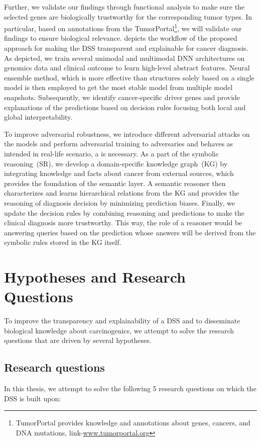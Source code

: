 \hspace*{3.5mm} Further, we validate our findings through functional analysis to make sure the selected genes are biologically trustworthy for the corresponding tumor types. In particular, based on annotations from the TumorPortal\footnote{
TumorPortal provides knowledge and annotations about genes, cancers, and DNA mutations, link-\url{www.tumorportal.org}}, we will validate our findings to ensure biological relevance.  depicts the workflow of the proposed approach for making the DSS transparent and explainable for cancer diagnosis. As depicted, we train several unimodal and multimodal DNN architectures on genomics data and clinical outcome to learn high-level abstract features. Neural ensemble method, which is more effective than structures solely based on a single model is then employed to get the most stable model from multiple model snapshots. Subsequently, we identify cancer-specific driver genes and provide explanations of the predictions based on decision rules focusing both local and global interpretability. 

\hspace*{3.5mm} To improve adversarial robustness, we introduce different adversarial attacks on the models and perform adversarial training to adversaries and behaves as intended in real-life scenario, a is necessary. As a part of the symbolic reasoning~(SR), we develop a domain-specific knowledge graph~(KG) by integrating knowledge and facts about cancer from external sources, which provides the foundation of the semantic layer. A semantic reasoner then characterizes and learns hierarchical relations from the KG and provides the reasoning of diagnosis decision by minimizing prediction biases. 
Finally, we update the decision rules by combining reasoning and predictions to make the clinical diagnosis more trustworthy. This way, the role of a reasoner would be answering queries based on the prediction whose answers will be derived from the symbolic rules stored in the KG itself.  

\section{Hypotheses and Research Questions} \label{hypotheses}
To improve the transparency and explainability of a DSS and to disseminate biological knowledge about carcinogenics, we attempt to solve the research questions that are driven by several hypotheses.  

\subsection{Research questions}
In this thesis, we attempt to solve the following 5 research questions on which the DSS is built upon:  

